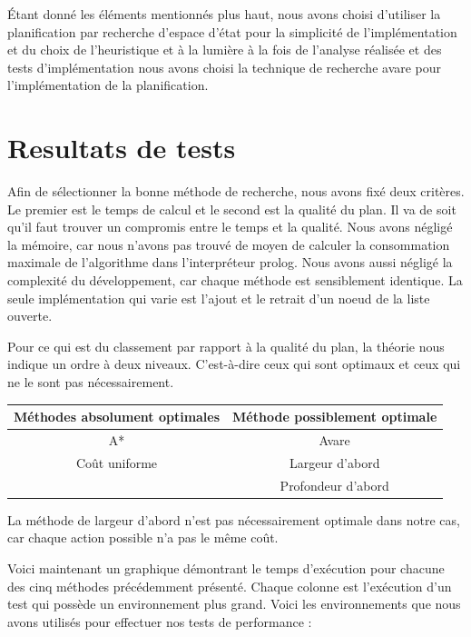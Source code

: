 \documentclass[12pt,english,frenchb,letterpaper]{article}
\begin{document}
Étant donné les éléments mentionnés plus haut, nous avons choisi d'utiliser la planification par recherche d'espace d'état pour la simplicité de l'implémentation et du choix de l'heuristique et à la lumière à la fois de l'analyse réalisée et des tests d'implémentation nous avons choisi la technique de recherche avare pour l'implémentation de la planification.

\section{Resultats de tests}



Afin de sélectionner la bonne méthode de recherche, nous avons fixé deux critères. Le premier est le temps de calcul et le second est la qualité du plan. Il va de soit qu'il faut trouver un compromis entre le temps et la qualité. Nous avons négligé la mémoire, car nous n'avons pas trouvé de moyen de calculer la consommation maximale de l'algorithme dans l'interpréteur prolog. Nous avons aussi négligé la complexité du développement, car chaque méthode est sensiblement identique. La seule implémentation qui varie est l'ajout et le retrait d'un noeud de la liste ouverte.

Pour ce qui est du classement par rapport à la qualité du plan, la théorie nous indique un ordre à deux niveaux. C'est-à-dire ceux qui sont optimaux et ceux qui ne le sont pas nécessairement.

\begin{center}
  \begin{tabular}{@{} cc @{}}
    \hline
    Méthodes absolument optimales & Méthode possiblement optimale\\ 
    \hline
    A* & Avare\\     
    Coût uniforme & Largeur d'abord \\
    &Profondeur d'abord\\
    \hline
  \end{tabular}
\end{center}

La méthode de largeur d'abord n'est pas nécessairement optimale dans notre cas, car chaque action possible n'a pas le même coût.

Voici maintenant un graphique démontrant le temps d'exécution pour chacune des cinq méthodes précédemment présenté. Chaque colonne est l'exécution d'un test qui possède un environnement plus grand. Voici les environnements que nous avons utilisés pour effectuer nos tests de performance :
\end{document}
